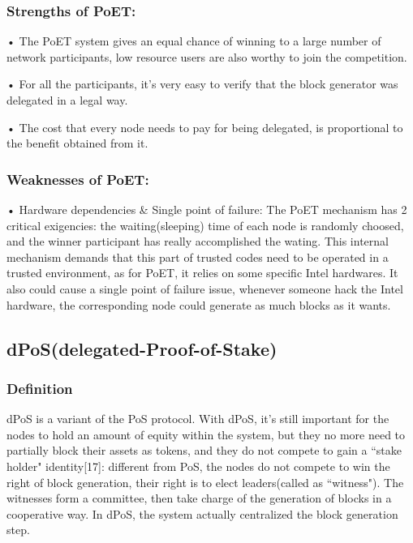 \documentclass[doublespacing]{bmcart}
\begin{document}
\begin{CJK*}{UTF8}{gbsn}
	\subsubsection*{Strengths of PoET:}	
    • The PoET system gives an equal chance of winning to a large number of network participants, low resource users are also worthy to join the competition.
    \par • For all the participants, it’s very easy to verify that the block generator was delegated in a legal way.
    \par • The cost that every node needs to pay for being delegated, is proportional to the benefit obtained from it.
\subsubsection*{Weaknesses of PoET:}
    • Hardware dependencies \& Single point of failure: The PoET mechanism has 2 critical exigencies: the waiting(sleeping) time of each node is randomly choosed, and the winner participant has really accomplished the wating. This internal mechanism demands that this part of trusted codes need to be operated in a trusted environment, as for PoET, it relies on some specific Intel hardwares. It also could cause a single point of failure issue, whenever someone hack the Intel hardware, the corresponding node could generate as much blocks as it wants.

\subsection{dPoS(delegated-Proof-of-Stake)}
\subsubsection*{Definition}	
dPoS is a variant of the PoS protocol. With dPoS, it's still important for the nodes to hold an amount of equity within the system, but they no more need to partially block their assets as tokens, and they do not compete to gain a ``stake holder" identity[17]: different from PoS, the nodes do not compete to win the right of block generation, their right is to elect leaders(called as ``witness"). The witnesses form a committee, then take charge of the generation of blocks in a cooperative way. In dPoS, the system actually centralized the block generation step.

\end{CJK*}
\end{document}
